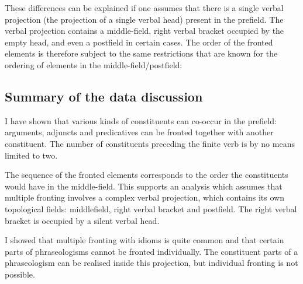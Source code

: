 These differences can be explained if one assumes that there is a single verbal projection (the
projection of a single verbal head) present in the prefield. The verbal projection contains a
middle-field, right verbal bracket occupied by the empty head, and even a postfield in certain
cases. The order of the fronted elements is therefore subject to the same restrictions that are
known for the ordering of elements in the middle-field/postfield:

\eal
{}
\zl
\eal
{}
\zl



\subsection{Summary of the data discussion}

I have shown that various kinds of constituents can co-occur in the prefield: arguments, adjuncts and predicatives
can be fronted together with another constituent. The number of constituents preceding the finite verb is by no
means limited to two.

The sequence of the fronted elements corresponds to the order the constituents would have in the middle-field.
This supports an analysis which assumes that multiple fronting involves a complex verbal projection, which contains its own
topological fields: middlefield, right verbal bracket and postfield. The right verbal bracket is occupied by a silent
verbal head.

I showed that multiple fronting with idioms is quite common and that certain parts of phraseologisms cannot be
fronted individually. The constituent parts of a phraseologism can be realised inside this projection, but individual fronting
is not possible.

